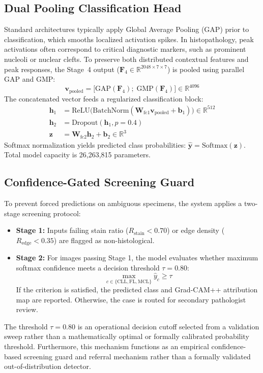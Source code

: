 \documentclass[conference]{IEEEtran}
\begin{document}
\subsection{Dual Pooling Classification Head}
Standard architectures typically apply Global Average Pooling (GAP) prior to classification, which smooths localized activation spikes. In histopathology, peak activations often correspond to critical diagnostic markers, such as prominent nucleoli or nuclear clefts. To preserve both distributed contextual features and peak responses, the Stage~4 output ($\mathbf{F}_{4} \in \mathbb{R}^{2048 \times 7 \times 7}$) is pooled using parallel GAP and GMP:
\begin{equation}
\label{eq:dual_pooling}
\mathbf{v}_{\text{pooled}} = \big[\text{GAP}(\mathbf{F}_{4});\; \text{GMP}(\mathbf{F}_{4})\big] \in \mathbb{R}^{4096}
\end{equation}
The concatenated vector feeds a regularized classification block:
\begin{align}
\mathbf{h}_1 &= \text{ReLU}\big(\text{BatchNorm}(\mathbf{W}_{\text{fc}1} \mathbf{v}_{\text{pooled}} + \mathbf{b}_1)\big) \in \mathbb{R}^{512} \\
\mathbf{h}_2 &= \text{Dropout}(\mathbf{h}_1, p = 0.4) \\
\mathbf{z}   &= \mathbf{W}_{\text{fc}2} \mathbf{h}_2 + \mathbf{b}_2 \in \mathbb{R}^3
\end{align}
Softmax normalization yields predicted class probabilities: $\hat{\mathbf{y}} = \text{Softmax}(\mathbf{z})$. Total model capacity is 26,263,815 parameters.

\subsection{Confidence-Gated Screening Guard}
To prevent forced predictions on ambiguous specimens, the system applies a two-stage screening protocol:
\begin{itemize}
    \item \textbf{Stage 1:} Inputs failing stain ratio ($R_{\text{stain}} < 0.70$) or edge density ($R_{\text{edge}} < 0.35$) are flagged as non-histological.
    \item \textbf{Stage 2:} For images passing Stage 1, the model evaluates whether maximum softmax confidence meets a decision threshold $\tau = 0.80$:
    \begin{equation}
    \label{eq:threshold_guard}
    \max_{c \in \{\text{CLL}, \text{FL}, \text{MCL}\}} \hat{y}_c \ge \tau
    \end{equation}
    If the criterion is satisfied, the predicted class and Grad-CAM++ attribution map are reported. Otherwise, the case is routed for secondary pathologist review.
\end{itemize}
The threshold $\tau = 0.80$ is an operational decision cutoff selected from a validation sweep rather than a mathematically optimal or formally calibrated probability threshold. Furthermore, this mechanism functions as an empirical confidence-based screening guard and referral mechanism rather than a formally validated out-of-distribution detector.
\end{document}
